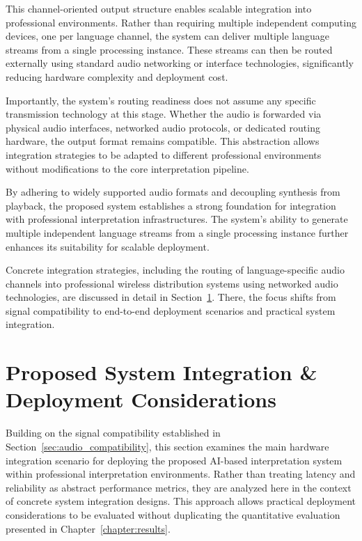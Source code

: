 This channel-oriented output structure enables scalable integration into professional environments. Rather than requiring multiple independent computing devices, one per language channel, the system can deliver multiple language streams from a single processing instance. These streams can then be routed externally using standard audio networking or interface technologies, significantly reducing hardware complexity and deployment cost.

Importantly, the system’s routing readiness does not assume any specific transmission technology at this stage. Whether the audio is forwarded via physical audio interfaces, networked audio protocols, or dedicated routing hardware, the output format remains compatible. This abstraction allows integration strategies to be adapted to different professional environments without modifications to the core interpretation pipeline.


By adhering to widely supported audio formats and decoupling synthesis from playback, the proposed system establishes a strong foundation for integration with professional interpretation infrastructures. The system’s ability to generate multiple independent language streams from a single processing instance further enhances its suitability for scalable deployment.

Concrete integration strategies, including the routing of language-specific audio channels into professional wireless distribution systems using networked audio technologies, are discussed in detail in Section~\ref{sec:integration}. There, the focus shifts from signal compatibility to end-to-end deployment scenarios and practical system integration.


\section{Proposed System Integration \& Deployment Considerations}
\label{sec:integration}

Building on the signal compatibility established in Section~\ref{sec:audio_compatibility}, this section examines the main hardware integration scenario for deploying the proposed AI-based interpretation system within professional interpretation environments. Rather than treating latency and reliability as abstract performance metrics, they are analyzed here in the context of concrete system integration designs. This approach allows practical deployment considerations to be evaluated without duplicating the quantitative evaluation presented in Chapter~\ref{chapter:results}.

